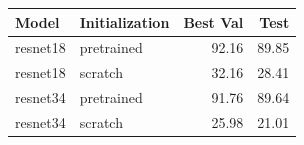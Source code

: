 \begin{tabular}{llrr}
\toprule
Model & Initialization & Best Val & Test \\
\midrule
resnet18 & pretrained & 92.16 & 89.85 \\
resnet18 & scratch & 32.16 & 28.41 \\
resnet34 & pretrained & 91.76 & 89.64 \\
resnet34 & scratch & 25.98 & 21.01 \\
\bottomrule
\end{tabular}
